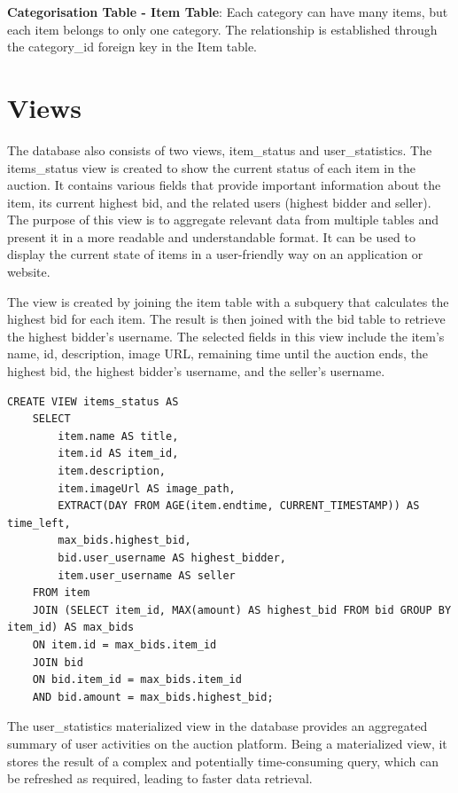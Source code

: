 \textbf{Categorisation Table - Item Table}: Each category can have many items, but each item belongs to only one category. The relationship is established through the category\_id foreign key in the Item table.


\section{Views}
The database also consists of two views, item\_status and user\_statistics.
The items\_status view is created to show the current status of each item in the auction. It contains various fields that provide important information about the item, its current highest bid, and the related users (highest bidder and seller). The purpose of this view is to aggregate relevant data from multiple tables and present it in a more readable and understandable format. It can be used to display the current state of items in a user-friendly way on an application or website.

The view is created by joining the item table with a subquery that calculates the highest bid for each item. The result is then joined with the bid table to retrieve the highest bidder's username. The selected fields in this view include the item's name, id, description, image URL, remaining time until the auction ends, the highest bid, the highest bidder's username, and the seller's username.
\begin{lstlisting}[style=sqlStyle]
	CREATE VIEW items_status AS
	SELECT 
		item.name AS title, 
		item.id AS item_id, 
		item.description, 
		item.imageUrl AS image_path,  
		EXTRACT(DAY FROM AGE(item.endtime, CURRENT_TIMESTAMP)) AS time_left,
		max_bids.highest_bid,
		bid.user_username AS highest_bidder,
		item.user_username AS seller
	FROM item 
	JOIN (SELECT item_id, MAX(amount) AS highest_bid FROM bid GROUP BY item_id) AS max_bids 
	ON item.id = max_bids.item_id
	JOIN bid
	ON bid.item_id = max_bids.item_id
	AND bid.amount = max_bids.highest_bid;
\end{lstlisting}

The user\_statistics materialized view in the database provides an aggregated summary of user activities on the auction platform. Being a materialized view, it stores the result of a complex and potentially time-consuming query, which can be refreshed as required, leading to faster data retrieval.

